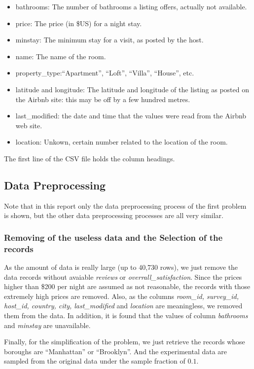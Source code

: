 \documentclass[12pt]{article}
\begin{document}
\begin{itemize}
\item bathrooms: The number of bathrooms a listing offers, actually not available.
\item price: The price (in \$US) for a night stay.
\item minstay: The minimum stay for a visit, as posted by the host.
\item name: The name of the room.
\item property\_type:“Apartment”, “Loft”, “Villa”, “House”, etc.
\item latitude and longitude: The latitude and longitude of the listing as posted on the Airbnb site: this may be off by a few hundred metres. 
\item last\_modified: the date and time that the values were read from the Airbnb web site.
\item location: Unkown, certain number related to the location of the room.
\end{itemize}
The first line of the CSV file holds the column headings.
\subsection{Data Preprocessing}
Note that in this report only the data preprocessing process of the first problem is shown, but the other data preprocessing processes are all very similar.
\subsubsection{Removing of the useless data and the Selection of the records}

As the amount of data is really large (up to 40,730 rows), we just remove the data records without avaiable \textit{reviews} or \textit{overrall\_satisfaction}. Since the prices higher than \$200 per night are assumed as not reasonable, the records with those extremely high prices are removed. 
 Also, as the columns \textit{room\_id, survey\_id, host\_id, country, city, last\_modified} and \textit{location} are meaningless, we removed them from the data. In addition, it is found that the values of column \textit{bathrooms} and \textit{minstay} are unavailable.
\par
Finally, for the simplification of the problem, we just retrieve the records whose boroughs are “Manhattan” or ``Brooklyn''. And the experimental data are sampled from the original data under the sample fraction of $0.1$.\par
\end{document}
